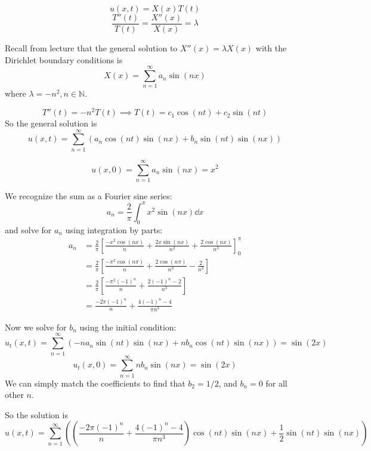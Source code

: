\documentclass[plain]{pset}
\begin{document}
\begin{solution}
    \[u(x, t) = X(x)T(t)\]
    \[\frac{T''(t)}{T(t)} = \frac{X''(x)}{X(x)} = \lambda\]

    Recall from lecture that the general solution to \(X''(x) = \lambda X(x)\) with the Dirichlet boundary conditions is
    \[X(x) = \sum_{n=1}^\infty a_n \sin(nx)\]
    where \(\lambda = -n^2, n \in \mathbb{N}\).

    \[T''(t) = -n^2T(t) \implies T(t) = c_1\cos(nt) + c_2\sin(nt)\]
    So the general solution is
    \[u(x, t) = \sum_{n=1}^\infty \left(a_n \cos(nt)\sin(nx) + b_n \sin(nt)\sin(nx)\right)\]

    \[u(x, 0) = \sum_{n=1}^\infty a_n \sin(nx) = x^2\]

    We recognize the sum as a Fourier sine series:
    \[a_n = \frac{2}{\pi} \int_0^\pi x^2 \sin(nx) \dd x\]
    and solve for \(a_n\) using integration by parts:
    \begin{align*}
        a_n & = \frac{2}{\pi} \left[\frac{-x^2\cos(nx)}{n} + \frac{2x\sin(nx)}{n^2} + \frac{2\cos(nx)}{n^3}\right]_0^\pi \\
            & = \frac{2}{\pi} \left[\frac{-\pi^2\cos(n\pi)}{n} + \frac{2\cos(n\pi)}{n^3} - \frac{2}{n^3}\right] \\
            &= \frac{2}{\pi} \left[\frac{-\pi^2(-1)^n}{n} + \frac{2(-1)^n - 2}{n^3}\right] \\
            &= \frac{-2\pi(-1)^n}{n} + \frac{4(-1)^n - 4}{\pi n^3}
    \end{align*}

    Now we solve for \(b_n\) using the initial condition:
    \[u_t(x, t) = \sum_{n=1}^\infty \left(-n a_n \sin(nt)\sin(nx) + n b_n \cos(nt)\sin(nx)\right) = \sin(2x)\]
    \[u_t(x, 0) = \sum_{n=1}^\infty n b_n \sin(nx) = \sin(2x)\]
    We can simply match the coefficients to find that \(b_2 = 1/2\), and \(b_n = 0\) for all other \(n\).

    So the solution is
    \[u(x, t) = \sum_{n=1}^\infty \left(\left(\frac{-2\pi(-1)^n}{n} + \frac{4(-1)^n - 4}{\pi n^3}\right) \cos(nt)\sin(nx) + \frac{1}{2}\sin(nt)\sin(nx)\right)\]


\end{solution}
\end{document}
